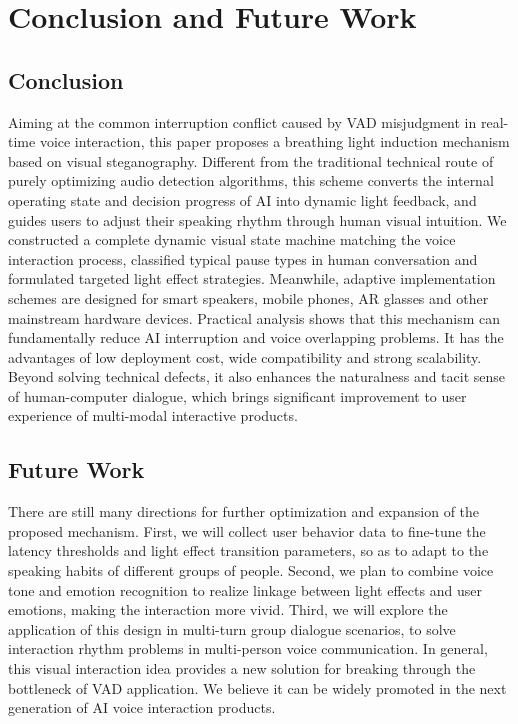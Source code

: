 \documentclass{article}
\begin{document}
\section{Conclusion and Future Work}
\subsection{Conclusion}
Aiming at the common interruption conflict caused by VAD misjudgment in real-time voice
interaction, this paper proposes a breathing light induction mechanism based on visual
steganography. Different from the traditional technical route of purely optimizing audio
detection algorithms, this scheme converts the internal operating state and decision
progress of AI into dynamic light feedback, and guides users to adjust their speaking rhythm
through human visual intuition.
We constructed a complete dynamic visual state machine matching the voice interaction
process, classified typical pause types in human conversation and formulated targeted light
effect strategies. Meanwhile, adaptive implementation schemes are designed for smart
speakers, mobile phones, AR glasses and other mainstream hardware devices.
Practical analysis shows that this mechanism can fundamentally reduce AI interruption and
voice overlapping problems. It has the advantages of low deployment cost, wide
compatibility and strong scalability. Beyond solving technical defects, it also enhances the
naturalness and tacit sense of human-computer dialogue, which brings significant
improvement to user experience of multi-modal interactive products.
\subsection{Future Work}
There are still many directions for further optimization and expansion of the proposed
mechanism. First, we will collect user behavior data to fine-tune the latency thresholds and
light effect transition parameters, so as to adapt to the speaking habits of different groups of
people. Second, we plan to combine voice tone and emotion recognition to realize linkage
between light effects and user emotions, making the interaction more vivid. Third, we will
explore the application of this design in multi-turn group dialogue scenarios, to solve
interaction rhythm problems in multi-person voice communication.
In general, this visual interaction idea provides a new solution for breaking through the
bottleneck of VAD application. We believe it can be widely promoted in the next generation
of AI voice interaction products.
\end{document}
